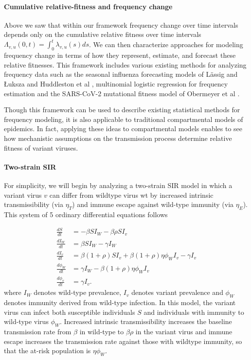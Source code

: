 \documentclass[11pt,oneside,letterpaper]{article}
\newcommand{\wt}{W}
\newcommand{\varEscape}{\eta}
\newcommand{\varTransmission}{\rho}
\begin{document}
\paragraph{Cumulative relative-fitness and frequency change}

Above we saw that within our framework frequency change over time intervals depends only on the cumulative relative fitness over time intervals $\Lambda_{v,u}(0, t) = \int_{0}^{t} \lambda_{v, u}(s)ds$.
We can then characterize approaches for modeling frequency change in terms of how they represent, estimate, and forecast these relative fitnesses.
This framework includes various existing methods for analyzing frequency data such as the seasonal influenza forecasting models of L{\"a}ssig and {\L}uksza \cite{luksza2014predictive} and Huddleston et al \cite{Huddleston2020}, multinomial logistic regression for frequency estimation \cite{Annavajhala2021} and the SARS-CoV-2 mutational fitness model of Obermeyer et al \cite{Obermeyer2022}.

Though this framework can be used to describe existing statistical methods for frequency modeling, it is also applicable to traditional compartmental models of epidemics.
In fact, applying these ideas to compartmental models enables to see how mechanistic assumptions on the transmission process determine relative fitness of variant viruses.

\paragraph{Two-strain SIR}%

For simplicity, we will begin by analyzing a two-strain SIR model in which a variant virus $v$ can differ from wildtype virus wt by increased intrinsic transmissibility (via $\varEscape_{T}$) and immune escape against wild-type immunity (via $\varEscape_{E}$).
This system of 5 ordinary differential equations follows

\begin{align*}
    \frac{d S}{d t} &= - \beta S I_{\wt} - \beta \varTransmission S I_{v}\\
    \frac{d I_{\wt}}{dt} &= \beta S I_{\wt} - \gamma I_{\wt}\\
    \frac{d I_{v}}{dt} &= \beta (1+\varTransmission) S I_{v} + \beta (1+\varTransmission) \varEscape \phi_{\wt} I_{v} - \gamma I_{v}\\
    \frac{d \phi_{\wt}}{dt} &= \gamma I_{\wt} - \beta (1+\varTransmission) \varEscape \phi_{\wt} I_{v}\\
    \frac{d \phi_{v}}{dt} &= \gamma I_{v}.
\end{align*}
where $I_{\wt}$ denotes wild-type prevalence, $I_{v}$ denotes variant prevalence and $\phi_{\wt}$ denotes immunity derived from wild-type infection.
In this model, the variant virus can infect both susceptible individuals $S$ and individuals with immunity to wild-type virus $\phi_{\wt}$.
Increased intrinsic transmissibility increases the baseline transmission rate from $\beta$ in wild-type to $\beta \varTransmission$ in the variant virus and immune escape increases the transmission rate against those with wildtype immunity, so that the at-risk population is $\varEscape \phi_{\wt}$.
\end{document}
